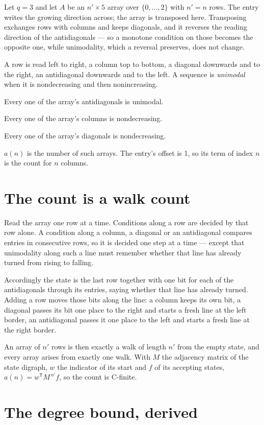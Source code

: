 \documentclass[11pt]{article}
\theoremstyle{definition}
\begin{document}
Let $q = 3$ and let $A$ be an $n' \times 5$ array over $\{0,\dots,2\}$ with $n' = n$ rows. The entry writes the growing direction across; the array is transposed here. Transposing exchanges rows with columns and keeps diagonals, and it reverses the reading direction of the antidiagonals --- so a monotone condition on those becomes the opposite one, while unimodality, which a reversal preserves, does not change.

A row is read left to right, a column top to bottom, a diagonal downwards and to the right, an antidiagonal downwards and to the left. A sequence is {\itshape unimodal} when it is nondecreasing and then nonincreasing.

Every one of the array's antidiagonals is unimodal.

Every one of the array's columns is nondecreasing.

Every one of the array's diagonals is nondecreasing.

$a(n)$ is the number of such arrays. The entry's offset is 1, so its term of index $n$ is the count for $n$ columns.

\section{The count is a walk count}

Read the array one row at a time. Conditions along a row are decided by that row alone. A condition along a column, a diagonal or an antidiagonal compares entries in consecutive rows, so it is decided one step at a time --- except that unimodality along such a line must remember whether that line has already turned from rising to falling.

Accordingly the state is the last row together with one bit for each of the antidiagonals through its entries, saying whether that line has already turned. Adding a row moves those bits along the line: a column keeps its own bit, a diagonal passes its bit one place to the right and starts a fresh line at the left border, an antidiagonal passes it one place to the left and starts a fresh line at the right border.

An array of $n'$ rows is then exactly a walk of length $n'$ from the empty state, and every array arises from exactly one walk. With $M$ the adjacency matrix of the state digraph, $w$ the indicator of its start and $f$ of its accepting states, $a(n) = w^{\mathsf T}M^{\,n'}f$, so the count is C-finite.

\section{The degree bound, derived}
\end{document}
